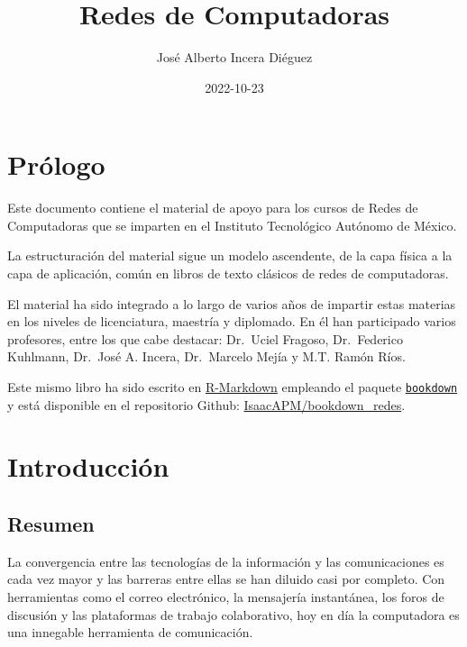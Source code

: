 \documentclass[
]{book}
\title{Redes de Computadoras}
\author{José Alberto Incera Diéguez}
\date{2022-10-23}
\begin{document}
\maketitle

{
\setcounter{tocdepth}{1}
\tableofcontents
}
\hypertarget{pruxf3logo}{%
\chapter*{Prólogo}\label{pruxf3logo}}

Este documento contiene el material de apoyo para los cursos de Redes de Computadoras que se imparten en el Instituto Tecnológico Autónomo de México.

La estructuración del material sigue un modelo ascendente, de la capa física a la capa de aplicación, común en libros de texto clásicos de redes de computadoras.

El material ha sido integrado a lo largo de varios años de impartir estas materias en los niveles de licenciatura, maestría y diplomado. En él han participado varios profesores, entre los que cabe destacar: Dr.~Uciel Fragoso, Dr.~Federico Kuhlmann, Dr.~José A. Incera, Dr.~Marcelo Mejía y M.T. Ramón Ríos.

Este mismo libro ha sido escrito en \href{http://rmarkdown.rstudio.com}{R-Markdown} empleando el paquete \href{https://bookdown.org/yihui/bookdown/}{\texttt{bookdown}} y está disponible en el repositorio Github: \href{https://github.com/IsaacAPM/bookdown_redes}{IsaacAPM/bookdown\_redes}.

\hypertarget{intro}{%
\chapter{Introducción}\label{intro}}

\hypertarget{resumen}{%
\section*{Resumen}\label{resumen}}

La convergencia entre las tecnologías de la información y las comunicaciones es cada vez mayor y las barreras entre ellas se han diluido casi por completo. Con herramientas como el correo electrónico, la mensajería instantánea, los foros de discusión y las plataformas de trabajo colaborativo, hoy en día la computadora es una innegable herramienta de comunicación.
\end{document}
